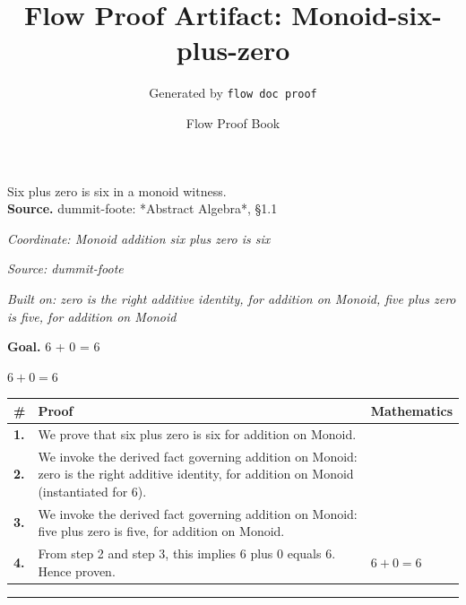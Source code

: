 \documentclass[11pt]{article}
\title{Flow Proof Artifact: Monoid-six-plus-zero}
\author{Generated by \texttt{flow doc proof}}
\date{Flow Proof Book}
\theoremstyle{definition}
\begin{document}
\maketitle
Six plus zero is six in a monoid witness.\\[0.5em]
\textbf{Source.} dummit-foote: *Abstract Algebra*, §1.1\\[0.5em]
\bigskip
{}\par
\smallskip\noindent\textit{Coordinate: Monoid \cdot addition \cdot six plus zero is six}\par
\smallskip\noindent\textit{Source: dummit-foote}\par
\smallskip\noindent\textit{Built on: zero is the right additive identity, for addition on Monoid, five plus zero is five, for addition on Monoid}\par
\medskip
\noindent\textbf{Goal.} 6 + 0 = 6\par
\noindent$\displaystyle 6 + 0 = 6$\par
\medskip
\noindent
\begin{tabular}{@{} >{\raggedright\arraybackslash}p{} >{\raggedright\arraybackslash}p{} >{\raggedleft\arraybackslash}p{} @{}}
\textbf{\#} & \textbf{Proof} & \textbf{Mathematics} \\
\midrule
\textbf{1.} & We prove that six plus zero is six for addition on Monoid. & \\[0.45em]
\textbf{2.} & We invoke the derived fact governing addition on Monoid: zero is the right additive identity, for addition on Monoid (instantiated for 6). & \\[0.45em]
\textbf{3.} & We invoke the derived fact governing addition on Monoid: five plus zero is five, for addition on Monoid. & \\[0.45em]
\textbf{4.} & From step 2 and step 3, this implies 6 plus 0 equals 6. Hence proven. & $\displaystyle 6 + 0 = 6$ \\[0.45em]
\bottomrule
\end{tabular}
\label{thm:Monoid-addition-six_plus_zero_is_six}
\par\medskip\hrule
\end{document}
